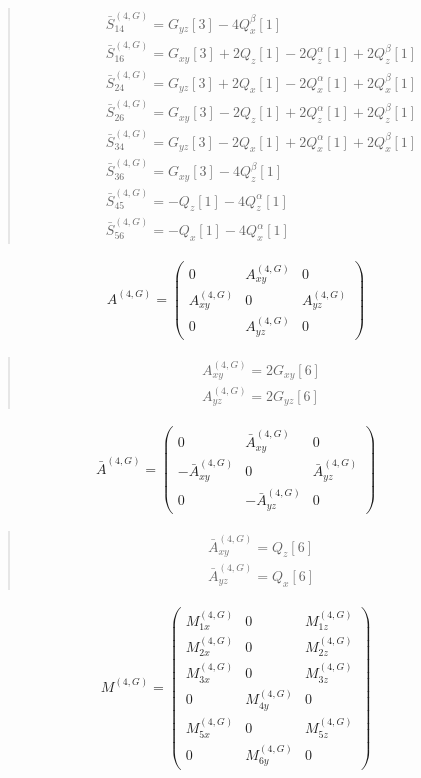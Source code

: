 \documentclass[fleqn,10pt]{jsarticle}
\begin{document}
\begin{quote}
\begin{align*}
& \bar{S}^{(4,G)}_{14} = G_{yz}[3] - 4 Q_{x}^{\beta}[1] \\
& \bar{S}^{(4,G)}_{16} = G_{xy}[3] + 2 Q_{z}[1] - 2 Q_{z}^{\alpha}[1] + 2 Q_{z}^{\beta}[1] \\
& \bar{S}^{(4,G)}_{24} = G_{yz}[3] + 2 Q_{x}[1] - 2 Q_{x}^{\alpha}[1] + 2 Q_{x}^{\beta}[1] \\
& \bar{S}^{(4,G)}_{26} = G_{xy}[3] - 2 Q_{z}[1] + 2 Q_{z}^{\alpha}[1] + 2 Q_{z}^{\beta}[1] \\
& \bar{S}^{(4,G)}_{34} = G_{yz}[3] - 2 Q_{x}[1] + 2 Q_{x}^{\alpha}[1] + 2 Q_{x}^{\beta}[1] \\
& \bar{S}^{(4,G)}_{36} = G_{xy}[3] - 4 Q_{z}^{\beta}[1] \\
& \bar{S}^{(4,G)}_{45} = - Q_{z}[1] - 4 Q_{z}^{\alpha}[1] \\
& \bar{S}^{(4,G)}_{56} = - Q_{x}[1] - 4 Q_{x}^{\alpha}[1]
\end{align*}
\end{quote}
\begin{align*}
A^{(4,G)} = \begin{pmatrix} 0 & A^{(4,G)}_{xy} & 0 \\ A^{(4,G)}_{xy} & 0 & A^{(4,G)}_{yz} \\ 0 & A^{(4,G)}_{yz} & 0 \end{pmatrix}
\end{align*}
\begin{quote}
\begin{align*}
& A^{(4,G)}_{xy} = 2 G_{xy}[6] \\
& A^{(4,G)}_{yz} = 2 G_{yz}[6]
\end{align*}
\end{quote}
\begin{align*}
\bar{A}^{(4,G)} = \begin{pmatrix} 0 & \bar{A}^{(4,G)}_{xy} & 0 \\ - \bar{A}^{(4,G)}_{xy} & 0 & \bar{A}^{(4,G)}_{yz} \\ 0 & - \bar{A}^{(4,G)}_{yz} & 0 \end{pmatrix}
\end{align*}
\begin{quote}
\begin{align*}
& \bar{A}^{(4,G)}_{xy} = Q_{z}[6] \\
& \bar{A}^{(4,G)}_{yz} = Q_{x}[6]
\end{align*}
\end{quote}
\begin{align*}
M^{(4,G)} = \begin{pmatrix} M^{(4,G)}_{1x} & 0 & M^{(4,G)}_{1z} \\ M^{(4,G)}_{2x} & 0 & M^{(4,G)}_{2z} \\ M^{(4,G)}_{3x} & 0 & M^{(4,G)}_{3z} \\ 0 & M^{(4,G)}_{4y} & 0 \\ M^{(4,G)}_{5x} & 0 & M^{(4,G)}_{5z} \\ 0 & M^{(4,G)}_{6y} & 0 \end{pmatrix}
\end{align*}
\end{document}
